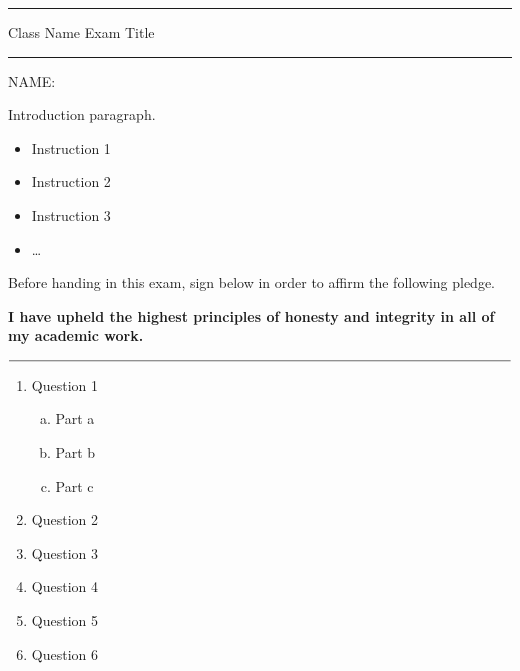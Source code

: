 \documentclass[12pt]{article}
\begin{document}
\hrule
\vspace{.2cm}

{\Large \noindent Class Name \hfill Exam Title}

\vspace{.3cm}
\hrule

\noindent NAME:

\vspace{1em}

\noindent \hrulefill\rule{0pt}{4pt}

Introduction paragraph.

\begin{itemize}

  \item Instruction 1
  \item Instruction 2
  \item Instruction 3
  \item \dots

\end{itemize}



\vfill

Before handing in this exam, sign below in order to affirm the following pledge.
\begin{center}
\textbf{I have upheld the highest principles of honesty and integrity in all of my academic work.}

\vspace{2em}

$\rule{13cm}{0.15mm}$

\end{center}

\vfill\phantom{}




\newpage

\begin{enumerate}

  \item Question 1
        \begin{enumerate}[(a)]
          \item Part a

          \vspace{4em}
          \item Part b

          \vspace{4em}
          \item Part c
        \end{enumerate}

  \vspace{4em}
  \item Question 2

  \vspace{10em}
  \item Question 3

  \vspace{10em}
  \item Question 4

  \newpage
  \item Question 5

  \vspace{30em}
  \item Question 6

\end{enumerate}
\end{document}
